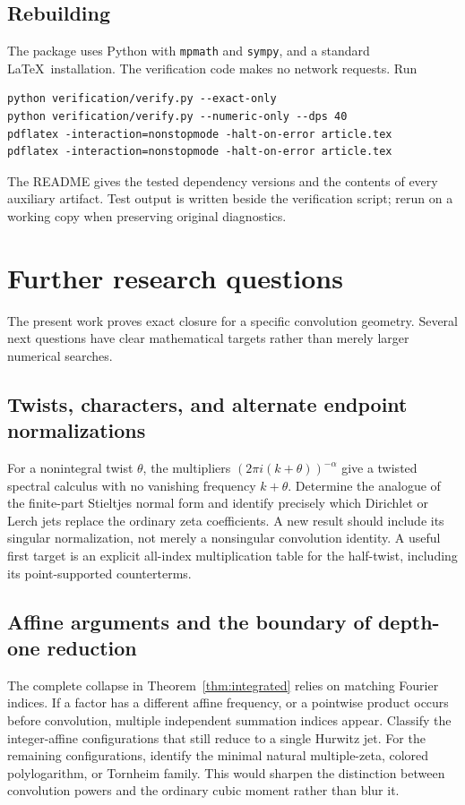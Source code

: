 \documentclass[11pt]{article}
\numberwithin{equation}{section}
\theoremstyle{definition}
\theoremstyle{remark}
\begin{document}
\subsection{Rebuilding}
The package uses Python with \texttt{mpmath} and \texttt{sympy}, and a
standard \LaTeX\ installation. The verification code makes no network
requests. Run
\begin{verbatim}
python verification/verify.py --exact-only
python verification/verify.py --numeric-only --dps 40
pdflatex -interaction=nonstopmode -halt-on-error article.tex
pdflatex -interaction=nonstopmode -halt-on-error article.tex
\end{verbatim}
The README gives the tested dependency versions and the contents of every
auxiliary artifact. Test output is written beside the verification
script; rerun on a working copy when preserving original diagnostics.

\section{Further research questions}
\label{sec:future}
The present work proves exact closure for a specific convolution geometry.
Several next questions have clear mathematical targets rather than merely
larger numerical searches.

\subsection{Twists, characters, and alternate endpoint normalizations}
For a nonintegral twist $\theta$, the multipliers
$(2\pi i(k+\theta))^{-\alpha}$ give a twisted spectral calculus with
no vanishing frequency $k+\theta$. Determine the analogue of the finite-part
Stieltjes normal form and identify precisely which Dirichlet or Lerch
jets replace the ordinary zeta coefficients. A new result should include its singular normalization, not merely
a nonsingular convolution identity.
A useful first target is an explicit all-index multiplication table for
the half-twist, including its point-supported counterterms.

\subsection{Affine arguments and the boundary of depth-one reduction}
The complete collapse in Theorem~\ref{thm:integrated} relies on matching
Fourier indices. If a factor has a different affine frequency, or a
pointwise product occurs before convolution, multiple independent
summation indices appear. Classify the integer-affine configurations
that still reduce to a single Hurwitz jet. For the remaining
configurations, identify the minimal natural multiple-zeta, colored
polylogarithm, or Tornheim family. This would sharpen the distinction
between convolution powers and the ordinary cubic moment rather than
blur it.
\end{document}
